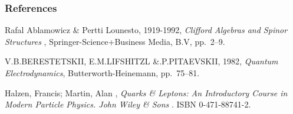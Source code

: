 %
%

\begin{frame} \frametitle{References}
\begin{thebibliography}{xx}\footnotesize

 {\sc Rafal Ablamowicz  \& Pertti Lounesto}, 1919-1992, {\em Clifford Algebras and
Spinor Structures }, Springer-Science+Business Media, B.V, pp.\ 2--9.

 {\sc V.B.BERESTETSKII, E.M.LIFSHITZL \&.P.PITAEVSKII}, 1982, {\em Quantum Electrodynamics}, Butterworth-Heinemann, pp.~75--81.


 {\sc Halzen, Francis; Martin, Alan }, {\em Quarks \& Leptons: An Introductory Course in Modern Particle Physics. John Wiley \& Sons }. ISBN 0-471-88741-2.

\end{thebibliography}
\end{frame}
